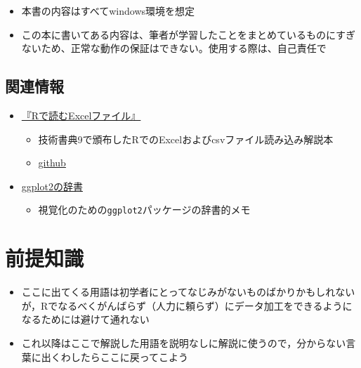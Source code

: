 \documentclass[
  xelatex,ja=standard, b5paper]{bxjsbook}
\providecommand{\tightlist}{%
  \setlength{\itemsep}{0pt}\setlength{\parskip}{0pt}}
\begin{document}
\begin{itemize}
\tightlist
\item
  本書の内容はすべてwindows環境を想定
\item
  この本に書いてある内容は、筆者が学習したことをまとめているものにすぎないため、正常な動作の保証はできない。使用する際は、自己責任で
\end{itemize}

\hypertarget{association}{%
\section*{関連情報}\label{association}}

\begin{itemize}
\tightlist
\item
  \href{https://techbookfest.org/product/4794168259903488?productVariantID=5913872206659584}{『Rで読むExcelファイル』}

  \begin{itemize}
  \tightlist
  \item
    技術書典9で頒布したRでのExcelおよびcsvファイル読み込み解説本
  \item
    \href{https://izunyan.github.io/excel_r/}{github}
  \end{itemize}
\item
  \href{https://izunyan.github.io/practice_ggplot2/}{ggplot2の辞書}

  \begin{itemize}
  \tightlist
  \item
    視覚化のための\texttt{ggplot2}パッケージの辞書的メモ
  \end{itemize}
\end{itemize}

\hypertarget{premise}{%
\chapter{前提知識}\label{premise}}

\begin{itemize}
\tightlist
\item
  ここに出てくる用語は初学者にとってなじみがないものばかりかもしれないが，Rでなるべくがんばらず（人力に頼らず）にデータ加工をできるようになるためには避けて通れない
\item
  これ以降はここで解説した用語を説明なしに解説に使うので，分からない言葉に出くわしたらここに戻ってこよう
\end{itemize}
\end{document}
